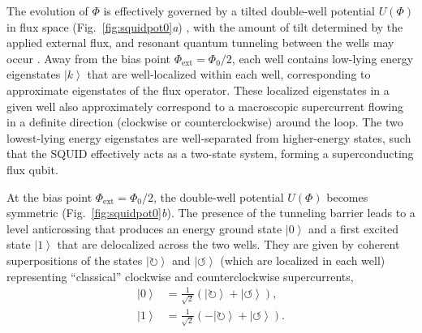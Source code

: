 \documentclass[3p,sort&compress,12pt]{elsarticle}
\newcommand{\ket}[1]{\left\vert{#1}\right\rangle}
\begin{document}
The evolution of $\Phi$ is effectively governed by a tilted double-well potential $U(\Phi)$ in flux space (Fig.~\ref{fig:squidpot0}\emph{a}) \cite{Weiss:1999:tv}, with the amount of tilt determined by the applied external flux, and resonant quantum tunneling between the wells may occur \cite{Silvestrini:1996:ii,Rouse:1998:om}. Away from the bias point $\Phi_\text{ext}=\Phi_0/2$, each well contains low-lying energy eigenstates $\ket{k}$ that are well-localized within each well, corresponding to approximate eigenstates of the flux operator. These localized eigenstates in a given well also approximately correspond to a macroscopic supercurrent flowing in a definite direction (clockwise or counterclockwise) around the loop. The two lowest-lying energy eigenstates are well-separated from higher-energy states, such that the SQUID effectively acts as a two-state system, forming a superconducting flux qubit.

At the bias point $\Phi_\text{ext}=\Phi_0/2$, the double-well potential $U(\Phi)$ becomes symmetric (Fig.~\ref{fig:squidpot0}\emph{b}). The presence of the tunneling barrier leads to a level anticrossing that produces an energy ground state $\ket{0}$ and a first excited state $\ket{1}$ that are delocalized across the two wells. They are given by coherent superpositions of the states $\ket{\circlearrowright}$ and $\ket{\circlearrowleft}$ (which are localized in each well) representing ``classical'' clockwise and counterclockwise supercurrents, 
%
\begin{subequations}
\begin{align} 
\ket{0} &= \frac{1}{\sqrt{2}} \left(  \ket{\circlearrowright} + 
\ket{\circlearrowleft} \right), \label{eq:scqqqq3}\\
\ket{1} &= \frac{1}{\sqrt{2}} \left( - \ket{\circlearrowright} + 
\ket{\circlearrowleft} \right). \label{eq:scqqqq4}
\end{align}
\end{subequations}
%
\end{document}
